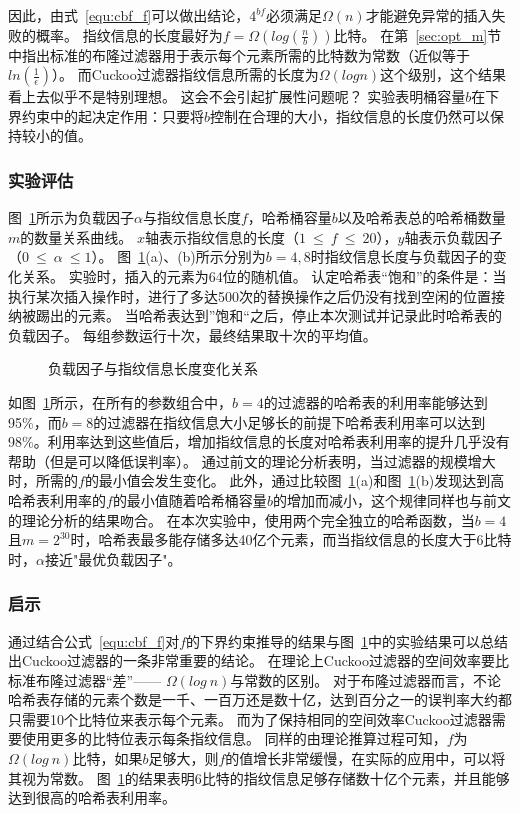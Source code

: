 因此，由式~\ref{equ:cbf_f}可以做出结论，$4^{bf}$必须满足$\Omega(n)$才能避免异常的插入失败的概率。
指纹信息的长度最好为$f = \Omega(log(\frac{n}{b}))$比特。
在第~\ref{sec:opt_m}节中指出标准的布隆过滤器用于表示每个元素所需的比特数为常数（近似等于$ln(\frac{1}{\epsilon})$）。
而Cuckoo过滤器指纹信息所需的长度为$\Omega(logn)$这个级别，这个结果看上去似乎不是特别理想。
这会不会引起扩展性问题呢？
实验表明桶容量$b$在下界约束中的起决定作用：只要将$b$控制在合理的大小，指纹信息的长度仍然可以保持较小的值。

\subsubsection{实验评估}
图~\ref{fig:cbf_fingerprint_size}所示为负载因子$\alpha$与指纹信息长度$f$，哈希桶容量$b$以及哈希表总的哈希桶数量$m$的数量关系曲线。
$x$轴表示指纹信息的长度（$1~\leq ~f~\leq ~20$），$y$轴表示负载因子（$0~\leq ~\alpha ~\leq 1$）。
图~\ref{fig:cbf_fingerprint_size}(a)、(b)所示分别为$b = 4,8$时指纹信息长度与负载因子的变化关系。
实验时，插入的元素为64位的随机值。
认定哈希表“饱和”的条件是：当执行某次插入操作时，进行了多达500次的替换操作之后仍没有找到空闲的位置接纳被踢出的元素。
当哈希表达到”饱和“之后，停止本次测试并记录此时哈希表的负载因子。
每组参数运行十次，最终结果取十次的平均值。
\begin{figure}[htbp]
\centering
{}
\caption{负载因子与指纹信息长度变化关系}
\label{fig:cbf_fingerprint_size}
\end{figure}

如图~\ref{fig:cbf_fingerprint_size}所示，在所有的参数组合中，$b = 4$的过滤器的哈希表的利用率能够达到95\%，而$b = 8$的过滤器在指纹信息大小足够长的前提下哈希表利用率可以达到98\%。利用率达到这些值后，增加指纹信息的长度对哈希表利用率的提升几乎没有帮助（但是可以降低误判率）。
通过前文的理论分析表明，当过滤器的规模增大时，所需的$f$的最小值会发生变化。
此外，通过比较图~\ref{fig:cbf_fingerprint_size}(a)和图~\ref{fig:cbf_fingerprint_size}(b)发现达到高哈希表利用率的$f$的最小值随着哈希桶容量$b$的增加而减小，这个规律同样也与前文的理论分析的结果吻合。
在本次实验中，使用两个完全独立的哈希函数，当$b = 4$且$m = 2^{30}$时，哈希表最多能存储多达40亿个元素，而当指纹信息的长度大于6比特时，$\alpha$接近"最优负载因子"。

\subsubsection{启示}
通过结合公式~\ref{equ:cbf_f}对$f$的下界约束推导的结果与图~\ref{fig:cbf_fingerprint_size}中的实验结果可以总结出Cuckoo过滤器的一条非常重要的结论。
在理论上Cuckoo过滤器的空间效率要比标准布隆过滤器“差”——
$\Omega(log~n)$与常数的区别。
对于布隆过滤器而言，不论哈希表存储的元素个数是一千、一百万还是数十亿，达到百分之一的误判率大约都只需要10个比特位来表示每个元素。
而为了保持相同的空间效率Cuckoo过滤器需要使用更多的比特位表示每条指纹信息。
同样的由理论推算过程可知，$f$为$\Omega(log~n)$比特，如果$b$足够大，则$f$的值增长非常缓慢，在实际的应用中，可以将其视为常数。
图~\ref{fig:cbf_fingerprint_size}的结果表明6比特的指纹信息足够存储数十亿个元素，并且能够达到很高的哈希表利用率。

